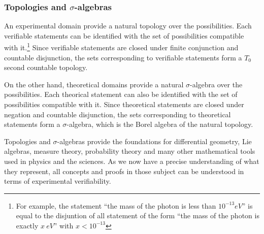 \documentclass[twocolumn]{article}
\newif\ifextended
\newcommand\fact[2]{\ifextended \emph{#1}. #2 \fi}
\begin{document}
\fact{Maximum cardinality for the possibilities}{Because the domain is generated by a countable set of verifiable statements, the possibilities must be distinguished with a countable sequence of boolean values. This means that the cardinality of the possibilities cannot exceed that of the continuum. This means that higher order infinities and all associated problems do not play a role in science.}


\subsubsection{Topologies and $\sigma$-algebras}

An experimental domain provide a natural topology over the possibilities. Each verifiable statements can be identified with the set of possibilities compatible with it.\footnote{For example, the statement ``the mass of the photon is less than $10^{-13} eV$'' is equal to the disjuntion of all statement of the form ``the mass of the photon is exactly $x~eV$'' with $x <  10^{-13}$} Since verifiable statements are closed under finite conjunction and countable disjunction, the sets corresponding to verifiable statements form a $T_0$ second countable topology.

On the other hand, theoretical domains provide a natural $\sigma$-algebra over the possibilities. Each theorical statement can also be identified with the set of possibilities compatible with it. Since theoretical statements are closed under negation and countable disjunction, the sets corresponding to theoretical statements form a $\sigma$-algebra, which is the Borel algebra of the natural topology.

Topologies and $\sigma$-algebras provide the foundations for differential geometry, Lie algebras, measure theory, probability theory and many other mathematical tools used in physics and the sciences. As we now have a precise understanding of what they represent, all concepts and proofs in those subject can be understood in terms of experimental verifiability.

\fact{Interior, exterior and boundary}{Given a test associated to a theoretical statement, it will either terminate successfully, terminate unsuccessfully or never terminate. Each Borel set is associated with a theoretical statement, which means it is associated with a test. The interior of the Borel set represents the cases in which the test will terminate successfully; the exterior represents the cases in which the tests will terminate unsuccessfully; the boundary represents the cases in which the test will not terminate.}
\end{document}
